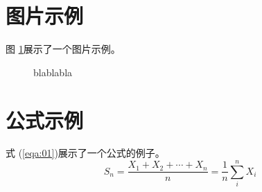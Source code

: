 \documentclass[a4paper,11pt,UTF8]{ctexart}
\begin{document}
\begin{appendix}
\section{图片示例}
图 \ref{fig:logo}展示了一个图片示例。
\begin{figure}[htbp]
\centering
{}
\caption{blablabla}
\label{fig:logo}
\end{figure}

\section{公式示例}
式 (\ref{eqa:01})展示了一个公式的例子。
\begin{equation}
S_n = \frac{X_1 + X_2 + \cdots + X_n}{n}
      = \frac{1}{n}\sum_{i}^{n} X_i
\label{eqa:01}
\end{equation}




\end{appendix}
\end{document}
